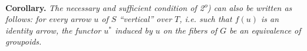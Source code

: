 \textbf{Corollary.} \textit{The necessary and sufficient condition of 2\textsuperscript{o}) can also be written as follows: for every arrow $u$ of $S$ ``vertical'' over $T$, i.e. such that $f(u)$ is an identity arrow, the functor $u^*$ induced by $u$ on the fibers of $G$ be an equivalence of groupoids.}